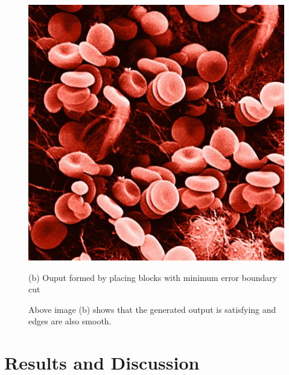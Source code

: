 \documentclass[12pt,a4paper]{report}
\begin{document}
\begin{figure}[H]
  \includegraphics[scale=0.2]{pics/rbc_cut.png}
    \caption*{(b) Ouput formed by placing blocks with minimum error boundary cut}
  \endminipage
  \newline 
  \caption*{Above image (b) shows that the generated output is satisfying and edges are also smooth.}
  
\end{figure}



\chapter{Results and Discussion}
\end{document}

